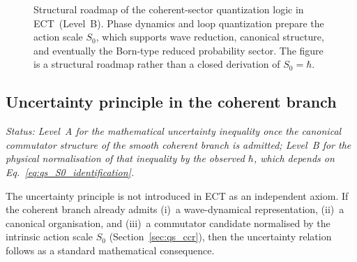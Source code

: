 \begin{figure}[h]
\centering
{}
\caption{Structural roadmap of the coherent-sector quantization logic
in ECT~(Level~B).
Phase dynamics and loop quantization prepare the action scale $S_0$,
which supports wave reduction, canonical structure, and eventually the
Born-type reduced probability sector.
The figure is a structural roadmap rather than a closed derivation
of $S_0=\hbar$.}
\label{fig:qs_quantization_chain}
\end{figure}

\subsection{Uncertainty principle in the coherent branch}
\label{sec:qs_uncertainty}

\textit{Status: Level~A for the mathematical uncertainty inequality
once the canonical commutator structure of the smooth coherent branch
is admitted; Level~B for the physical normalisation of that inequality
by the observed $\hbar$, which depends on
Eq.~\eqref{eq:qs_S0_identification}.}

\medskip
The uncertainty principle is not introduced in ECT as an independent
axiom.
If the coherent branch already admits (i)~a wave-dynamical
representation, (ii)~a canonical organisation, and (iii)~a commutator
candidate normalised by the intrinsic action scale $S_0$
(Section~\ref{sec:qs_ccr}), then the uncertainty relation follows as
a standard mathematical consequence.

